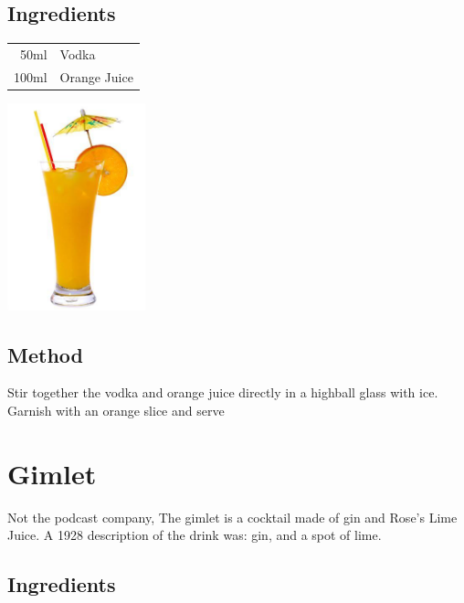 \documentclass[12pt, letterpaper]{article}
\begin{document}
\subsection*{Ingredients}

\begin{multicols}{2}

\begin{tabular} { r | l}
    50ml & Vodka \\
    100ml & Orange Juice  \\
\end{tabular}

\includegraphics[height=6cm]{screwdriver}

\end{multicols}

\subsection*{Method}
Stir together the vodka and orange juice directly in a highball glass with ice.
Garnish with an orange slice and serve

\pagebreak
\section{Gimlet}
Not the podcast company, The gimlet is a cocktail made of gin and Rose's Lime Juice.
A 1928 description of the drink was: gin, and a spot of lime. 

\subsection*{Ingredients}
\end{document}

